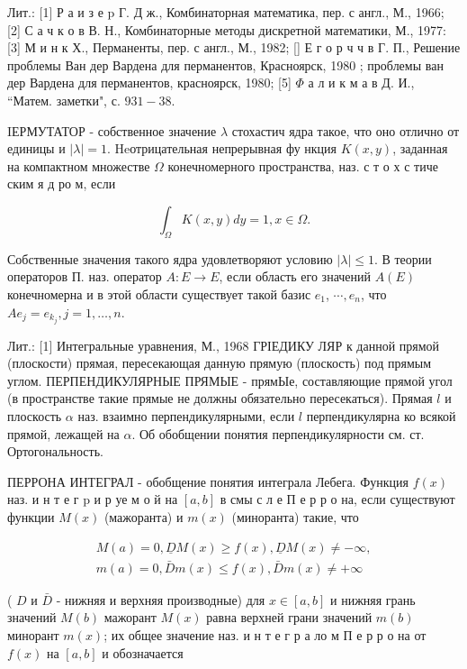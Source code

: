 \documentclass[10pt]{article}
\begin{document}
Лит.: [1] Р а и з е p Г. Д ж., Комбинаторная математика, пер. с англ., М., 1966; [2] С а ч к о в В. Н., Комбинаторные методы дискретной математики, М., 1977: [3] М и н к Х., Перманенты, пер. с англ., М., 1982; [ُ] Е г о р ч ч в Г. П., Решение проблемы Ван дер Вардена для перманентов, Красноярск, 1980 ; проблемы ван дер Вардена для перманентов, красноярск, 1980; [5] $\Phi$ а л и к м а в Д. И., “Матем. заметки",
с. $931-38$.

IЕРМУТАТОР - собственное значение $\lambda$ стохастич ядра такое, что оно отлично от единицы и $|\lambda|=1$. Heотрицательная непрерывная фу нкция $K(x, y)$, заданная на компактном множестве $\Omega$ конечномерного пространства, наз. с т о х с тиче ским я д ро м, если

\[
\int_{\Omega} K(x, y) d y=1, x \in \Omega .
\]

Собственные значения такого ядра удовлетворяют условию $|\lambda| \leqslant 1$. В теории операторов П. наз. оператор $A: E \rightarrow E$, если область его значений $A(E)$ конечномерна и в этой области существует такой базис $e_{1}$, $\cdots, e_{n}$, что $A e_{j}=e_{k_{j}}, j=1, \ldots, n$.

Лит.: [1] Интегральные уравнения, М., 1968 ГРІЕДИКУ ЛЯР к данной прямой (плоскости) прямая, пересекающая данную прямую (плоскость) под прямым углом. ПЕРПЕНДИКУЛЯРНЫЕ ПРЯМЫЕ - прямЫе, составляющие прямой угол (в пространстве такие прямые не должны обязательно пересекаться). Прямая $l$ и плоскость $\alpha$ наз. взаимно перпендикулярными, если $l$ перпендикулярна ко всякой прямой, лежащей на $\alpha$. Об обобщении понятия перпендикулярности см. ст. Ортогональность.

ПЕРРОНА ИНТЕГРАЛ - обобщение понятия интеграла Лебега. Функция $f(x)$ наз. и н т е г p и р уе м о й на $[a, b]$ в смы с л е П е р р о на, если существуют функции $M(x)$ (мажоранта) и $m(x)$ (миноранта) такие, что

\[
\begin{gathered}
M(a)=0, \underline{D} M(x) \geqslant f(x), \underline{D} M(x) \neq-\infty, \\
m(a)=0, \bar{D} m(x) \leqslant f(x), \bar{D} m(x) \neq+\infty
\end{gathered}
\]

( $D$ и $\bar{D}$ - нижняя и верхняя производные) для $x \in[a, b]$ и нижняя грань значений $M(b)$ мажорант $M(x)$ равна верхней грани значений $m(b)$ минорант $m(x)$; их общее значение наз. и н т е г р а ло м П е р р о на от $f(x)$ на $[a, b]$ и обозначается
\end{document}
